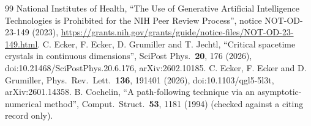 \documentclass[aps,prd,onecolumn,superscriptaddress,nofootinbib,10pt]{revtex4-2}
\begin{document}
\begin{thebibliography}{99}
 National Institutes of Health, ``The Use of Generative Artificial Intelligence Technologies is
Prohibited for the NIH Peer Review Process'', notice NOT-OD-23-149 (2023),
\url{https://grants.nih.gov/grants/guide/notice-files/NOT-OD-23-149.html}.
 C. Ecker, F. Ecker, D. Grumiller and T. Jechtl, ``Critical spacetime crystals in continuous
dimensions'', SciPost Phys.\ \textbf{20}, 176 (2026), doi:10.21468/SciPostPhys.20.6.176, arXiv:2602.10185.
 C. Ecker, F. Ecker and D. Grumiller, Phys.\ Rev.\ Lett.\ \textbf{136}, 191401 (2026),
doi:10.1103/qgl5-5l3t, arXiv:2601.14358.
 B. Cochelin, ``A path-following technique via an asymptotic-numerical method'', Comput.\ Struct.\
\textbf{53}, 1181 (1994) (checked against a citing record only).
\end{thebibliography}
\end{document}
